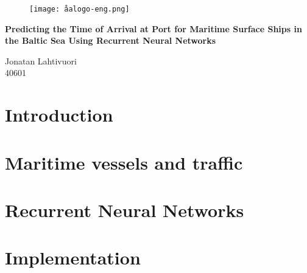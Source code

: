 \documentclass[12pt]{article}
\begin{document}
\begin{titlepage}
\vspace*{20mm}
\begin{figure}[h]
\centering
\texttt{[image: åalogo-eng.png]}
\end{figure}
\begin{center}
	\Huge\textbf{Predicting the Time of Arrival at Port for Maritime Surface Ships in the Baltic Sea Using Recurrent Neural Networks}
\end{center}
\vfill
\begin{flushright}
Jonatan Lahtivuori\\
40601
\end{flushright}
\end{titlepage}




\newpage
\tableofcontents

\newpage
{}
\section{Introduction}


\newpage
\section{Maritime vessels and traffic}


\newpage
\section{Recurrent Neural Networks}


\newpage
\section{Implementation}

\end{document}
